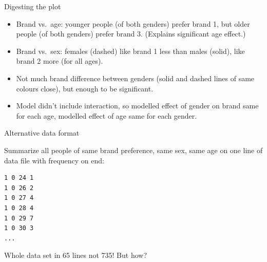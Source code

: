 \documentclass[ignorenonframetext,]{beamer}
\begin{document}
\begin{frame}{Digesting the plot}
\protect\hypertarget{digesting-the-plot}{}

\begin{itemize}
\item
  Brand vs.~age: younger people (of both genders) prefer brand 1, but
  older people (of both genders) prefer brand 3. (Explains significant
  age effect.)
\item
  Brand vs.~sex: females (dashed) like brand 1 less than males (solid),
  like brand 2 more (for all ages).
\item
  Not much brand difference between genders (solid and dashed lines of
  same colours close), but enough to be significant.
\item
  Model didn't include interaction, so modelled effect of gender on
  brand same for each age, modelled effect of age same for each gender.
\end{itemize}

\end{frame}

\begin{frame}[fragile]{Alternative data format}
\protect\hypertarget{alternative-data-format}{}

Summarize all people of same brand preference, same sex, same age on one
line of data file with frequency on end:

\begin{verbatim}
1 0 24 1
1 0 26 2
1 0 27 4
1 0 28 4
1 0 29 7
1 0 30 3
...
\end{verbatim}

Whole data set in 65 lines not 735! But how?

\end{frame}
\end{document}
